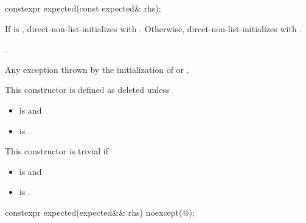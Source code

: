 %
\begin{itemdecl}
constexpr expected(const expected& rhs);
\end{itemdecl}

\begin{itemdescr}
\pnum
\effects
If  is ,
direct-non-list-initializes  with .
Otherwise, direct-non-list-initializes  with .

\pnum
\ensures
{}.

\pnum
\throws
Any exception thrown by the initialization of  or .

\pnum
\remarks
This constructor is defined as deleted unless
\begin{itemize}
\item
{} is  and
\item
{} is .
\end{itemize}

\pnum
This constructor is trivial if
\begin{itemize}
\item
{} is  and
\item
{} is .
\end{itemize}
\end{itemdescr}

%
\begin{itemdecl}
constexpr expected(expected&& rhs) noexcept(@\seebelow@);
\end{itemdecl}

